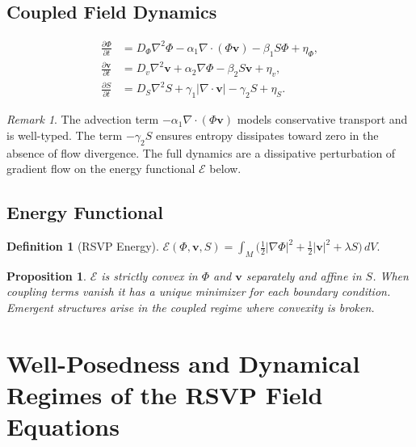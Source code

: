 \documentclass[12pt,a4paper,oneside]{book}
\numberwithin{equation}{chapter}
\theoremstyle{plain}
\newtheorem{proposition}[theorem]{Proposition}
\theoremstyle{definition}
\newtheorem{definition}[theorem]{Definition}
\theoremstyle{remark}
\newtheorem{remark}[theorem]{Remark}
\begin{document}
\section{Coupled Field Dynamics}

\begin{align}
\frac{\partial \Phi}{\partial t}
&= D_\Phi \nabla^2 \Phi
- \alpha_1 \nabla \cdot (\Phi \mathbf{v})
- \beta_1 S \Phi + \eta_\Phi, \label{eq:phi} \\
\frac{\partial \mathbf{v}}{\partial t}
&= D_v \nabla^2 \mathbf{v}
+ \alpha_2 \nabla \Phi
- \beta_2 S \mathbf{v} + \eta_v, \label{eq:v} \\
\frac{\partial S}{\partial t}
&= D_S \nabla^2 S
+ \gamma_1 |\nabla \cdot \mathbf{v}|
- \gamma_2 S + \eta_S. \label{eq:S}
\end{align}

\begin{remark}
The advection term $-\alpha_1 \nabla \cdot (\Phi \mathbf{v})$ models
conservative transport and is well-typed. The term $-\gamma_2 S$
ensures entropy dissipates toward zero in the absence of flow
divergence. The full dynamics are a dissipative perturbation of
gradient flow on the energy functional $\mathcal{E}$ below.
\end{remark}

\section{Energy Functional}

\begin{definition}[RSVP Energy]
$\mathcal{E}(\Phi,\mathbf{v},S) =
\int_M \bigl(\tfrac{1}{2}|\nabla\Phi|^2
+ \tfrac{1}{2}|\mathbf{v}|^2 + \lambda S\bigr)\,dV$.
\end{definition}

\begin{proposition}
\label{prop:energy-convex}
$\mathcal{E}$ is strictly convex in $\Phi$ and $\mathbf{v}$
separately and affine in $S$. When coupling terms vanish it has a
unique minimizer for each boundary condition. Emergent structures
arise in the coupled regime where convexity is broken.
\end{proposition}


\chapter[Well-Posedness of the RSVP Equations]{Well-Posedness and Dynamical Regimes of the RSVP Field Equations}
\label{ch:wellposedness}
\end{document}
